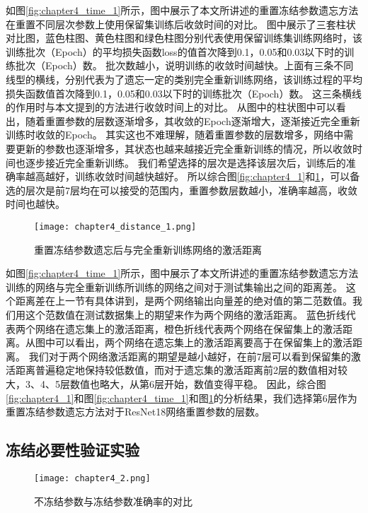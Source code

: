 如图\ref{fig:chapter4_time_1}所示，图中展示了本文所讲述的重置冻结参数遗忘方法在重置不同层次参数上使用保留集训练后收敛时间的对比。
图中展示了三套柱状对比图，蓝色柱图、黄色柱图和绿色柱图分别代表使用保留训练集训练网络时，该训练批次（Epoch）的平均损失函数loss的值首次降到0.1，0.05和0.03以下时的训练批次（Epoch）数。
批次数越小，说明训练的收敛时间越快。上面有三条不同线型的横线，分别代表为了遗忘一定的类别完全重新训练网络，该训练过程的平均损失函数值首次降到0.1，0.05和0.03以下时的训练批次（Epoch）数。
这三条横线的作用时与本文提到的方法进行收敛时间上的对比。
从图中的柱状图中可以看出，随着重置参数的层数逐渐增多，其收敛的Epoch逐渐增大，逐渐接近完全重新训练时收敛的Epoch。
其实这也不难理解，随着重置参数的层数增多，网络中需要更新的参数也逐渐增多，其状态也越来越接近完全重新训练的情况，所以收敛时间也逐步接近完全重新训练。
我们希望选择的层次是选择该层次后，训练后的准确率越高越好，训练收敛时间越快越好。
所以综合图\ref{fig:chapter4_1}和\ref{fig:chapter4_distance_1}，可以备选的层次是前7层均在可以接受的范围内，重置参数层数越小，准确率越高，收敛时间也越快。
\begin{figure}
    \centering
    \texttt{[image: chapter4\_distance\_1.png]}
    \caption{重置冻结参数遗忘后与完全重新训练网络的激活距离}
    \label{fig:chapter4_distance_1}
\end{figure}

如图\ref{fig:chapter4_time_1}所示，图中展示了本文所讲述的重置冻结参数遗忘方法训练的网络与完全重新训练所训练的网络之间对于测试集输出之间的距离差。
这个距离差在上一节有具体讲到，是两个网络输出向量差的绝对值的第二范数值。我们用这个范数值在测试数据集上的期望来作为两个网络的激活距离。
蓝色折线代表两个网络在遗忘集上的激活距离，橙色折线代表两个网络在保留集上的激活距离。从图中可以看出，两个网络在遗忘集上的激活距离要高于在保留集上的激活距离。
我们对于两个网络激活距离的期望是越小越好，在前7层可以看到保留集的激活距离普遍稳定地保持较低数值，而对于遗忘集的激活距离前2层的数值相对较大，3、4、5层数值也略大，从第6层开始，数值变得平稳。
因此，综合图\ref{fig:chapter4_1}和图\ref{fig:chapter4_time_1}和图\ref{fig:chapter4_distance_1}的分析结果，我们选择第6层作为重置冻结参数遗忘方法对于ResNet18网络重置参数的层数。
\subsection{冻结必要性验证实验}
\begin{figure}
    \centering
    \texttt{[image: chapter4\_2.png]}
    \caption{不冻结参数与冻结参数准确率的对比}
    \label{fig:chapter4_2}
\end{figure}

